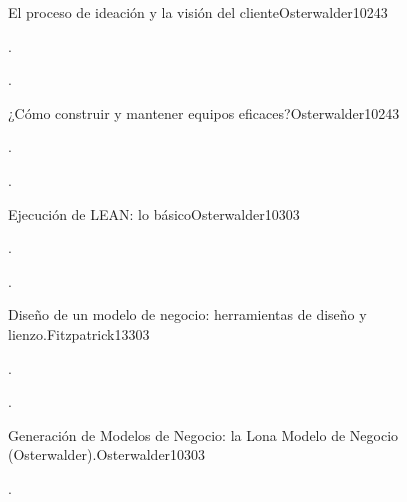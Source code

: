 \begin{syllabus}
\begin{unit}{}{El proceso de ideación y la visión del cliente}{Osterwalder10}{24}{3}
   \begin{topics}
      \item . 
   \end{topics}

   \begin{learningoutcomes}
      \item .
      \end{learningoutcomes}
\end{unit}

\begin{unit}{}{¿Cómo construir y mantener equipos eficaces?}{Osterwalder10}{24}{3}
   \begin{topics}
      \item . 
      \end{topics}

   \begin{learningoutcomes}
      \item .
   \end{learningoutcomes}
\end{unit}

\begin{unit}{}{Ejecución de LEAN: lo básico}{Osterwalder10}{30}{3}
   \begin{topics}
      \item .
   \end{topics}

   \begin{learningoutcomes}
      \item . 
   \end{learningoutcomes}
\end{unit}

\begin{unit}{}{Diseño de un modelo de negocio: herramientas de diseño y lienzo.}{Fitzpatrick13}{30}{3}
   \begin{topics}
      \item .
   \end{topics}

   \begin{learningoutcomes}
      \item .
   \end{learningoutcomes}
\end{unit}

\begin{unit}{}{Generación de Modelos de Negocio: la Lona Modelo de Negocio (Osterwalder).}{Osterwalder10}{30}{3}
   \begin{topics}
      \item . 
   \end{topics}


\end{unit}
\end{syllabus}
